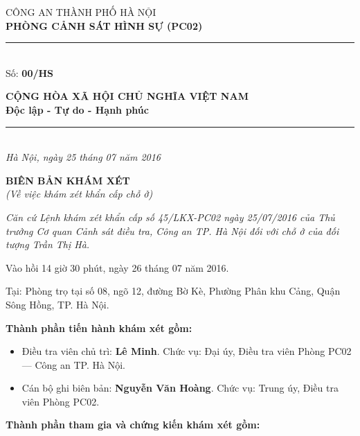 \documentclass[12pt,a4paper]{article}
\begin{document}
\noindent
\begin{minipage}[t]{0.46\textwidth}
    \begin{center}
        \fontsize{11pt}{13pt}\selectfont
        CÔNG AN THÀNH PHỐ HÀ NỘI\\
        \textbf{PHÒNG CẢNH SÁT HÌNH SỰ (PC02)}\\[-0.2em]
        \rule{3.2cm}{0.6pt}\\[0.25cm]
        \fontsize{11pt}{13pt}\selectfont Số: \textbf{00/HS}
    \end{center}
\end{minipage}
\hfill
\begin{minipage}[t]{0.52\textwidth}
    \begin{center}
        \fontsize{11pt}{13pt}\selectfont
        \textbf{CỘNG HÒA XÃ HỘI CHỦ NGHĨA VIỆT NAM}\\
        \textbf{Độc lập - Tự do - Hạnh phúc}\\[-0.2em]
        \rule{3.6cm}{0.6pt}\\[0.25cm]
        \textit{Hà Nội, ngày 25 tháng 07 năm 2016}
    \end{center}
\end{minipage}

\vspace{0.5cm}

\begin{center}
    \textbf{\Large BIÊN BẢN KHÁM XÉT}\\[0.15cm]
    \textit{(Về việc khám xét khẩn cấp chỗ ở)}
\end{center}

\vspace{0.3cm}

\textit{Căn cứ Lệnh khám xét khẩn cấp số 45/LKX-PC02 ngày 25/07/2016 của Thủ trưởng Cơ quan Cảnh sát điều tra, Công an TP. Hà Nội đối với chỗ ở của đối tượng Trần Thị Hà.}


Vào hồi 14 giờ 30 phút, ngày 26 tháng 07 năm 2016.


Tại: Phòng trọ tại số 08, ngõ 12, đường Bờ Kè, Phường Phân khu Cảng, Quận Sông Hồng, TP. Hà Nội.


\textbf{Thành phần tiến hành khám xét gồm:}

\begin{itemize}[leftmargin=*, itemsep=2pt, topsep=2pt, parsep=0pt]
  \item Điều tra viên chủ trì: \textbf{Lê Minh}. Chức vụ: Đại úy, Điều tra viên Phòng PC02 — Công an TP. Hà Nội.
  \item Cán bộ ghi biên bản: \textbf{Nguyễn Văn Hoàng}. Chức vụ: Trung úy, Điều tra viên Phòng PC02.

\end{itemize}
\textbf{Thành phần tham gia và chứng kiến khám xét gồm:}
\end{document}

